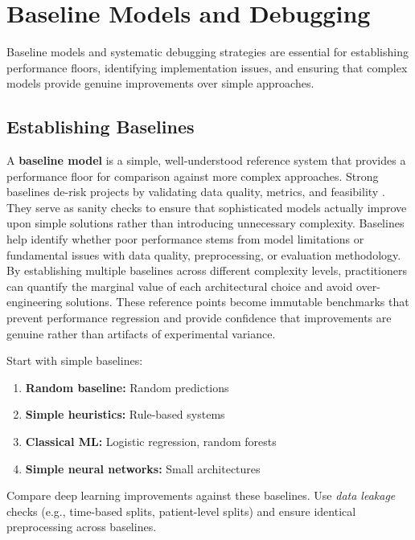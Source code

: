 
\section{Baseline Models and Debugging }
\label{sec:baselines-debugging}

Baseline models and systematic debugging strategies are essential for establishing performance floors, identifying implementation issues, and ensuring that complex models provide genuine improvements over simple approaches.

\subsection{Establishing Baselines}

A \textbf{baseline model} is a simple, well-understood reference system that provides a performance floor for comparison against more complex approaches. Strong baselines de-risk projects by validating data quality, metrics, and feasibility \textcite{GoodfellowEtAl2016,Prince2023}. They serve as sanity checks to ensure that sophisticated models actually improve upon simple solutions rather than introducing unnecessary complexity. Baselines help identify whether poor performance stems from model limitations or fundamental issues with data quality, preprocessing, or evaluation methodology. By establishing multiple baselines across different complexity levels, practitioners can quantify the marginal value of each architectural choice and avoid over-engineering solutions. These reference points become immutable benchmarks that prevent performance regression and provide confidence that improvements are genuine rather than artifacts of experimental variance. 

Start with simple baselines:
\begin{enumerate}
    \item \textbf{Random baseline:} Random predictions
    \item \textbf{Simple heuristics:} Rule-based systems
    \item \textbf{Classical ML:} Logistic regression, random forests
    \item \textbf{Simple neural networks:} Small architectures
\end{enumerate}

Compare deep learning improvements against these baselines. Use \emph{data leakage}  checks (e.g., time-based splits, patient-level splits) and ensure identical preprocessing across baselines.

